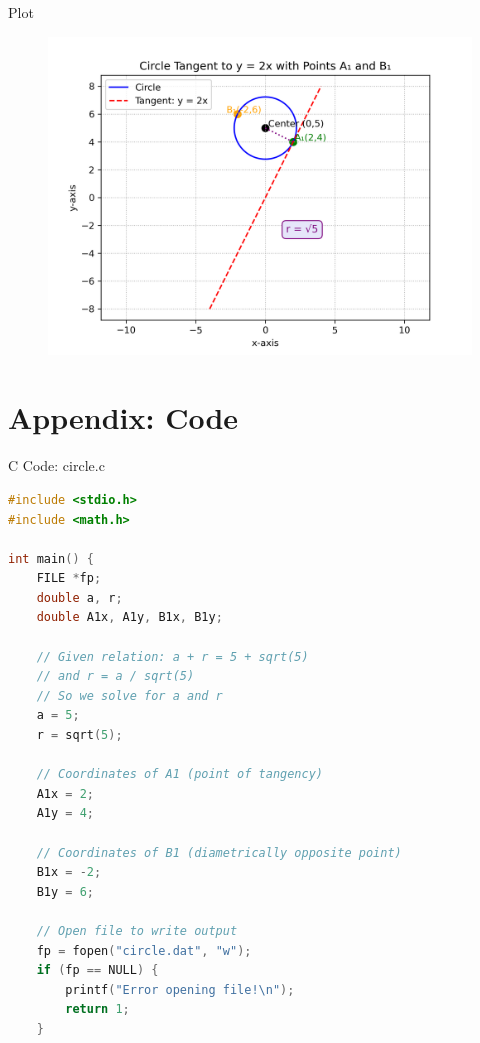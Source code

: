 \documentclass{beamer}
\numberwithin{equation}{section}
\theoremstyle{remark}
\begin{document}
\begin{frame}{Plot}
    \begin{figure}[h!]
    \centering
    \includegraphics[width=0.8\columnwidth]{figs/01.png}
    \caption{}
    \label{fig:placeholder}
\end{figure}
\end{frame}

\section*{Appendix: Code}

\begin{frame}[fragile]{C Code: circle.c}
\begin{lstlisting}[language=C]
#include <stdio.h>
#include <math.h>

int main() {
    FILE *fp;
    double a, r;
    double A1x, A1y, B1x, B1y;

    // Given relation: a + r = 5 + sqrt(5)
    // and r = a / sqrt(5)
    // So we solve for a and r
    a = 5;
    r = sqrt(5);

    // Coordinates of A1 (point of tangency)
    A1x = 2;
    A1y = 4;

    // Coordinates of B1 (diametrically opposite point)
    B1x = -2;
    B1y = 6;

    // Open file to write output
    fp = fopen("circle.dat", "w");
    if (fp == NULL) {
        printf("Error opening file!\n");
        return 1;
    }
\end{lstlisting}
\end{frame}
\end{document}
